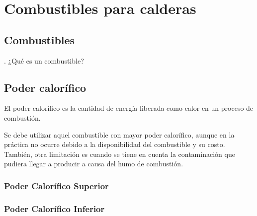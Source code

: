 \section{Combustibles para calderas}
\subsection{Combustibles}

\begin{preguntas}
	. ¿Qué es un combustible?
\end{preguntas}

\subsection{Poder calorífico}
El poder calorífico es la cantidad de energía liberada como calor en un proceso de combustión.

Se debe utilizar aquel combustible con mayor poder calorífico, aunque en la práctica no ocurre debido a la disponibilidad del combustible y su costo. También, otra limitación es cuando se tiene en cuenta la contaminación que pudiera llegar a producir a causa del humo de combustión.

\subsubsection{Poder Calorífico Superior}

\subsubsection{Poder Calorífico Inferior}